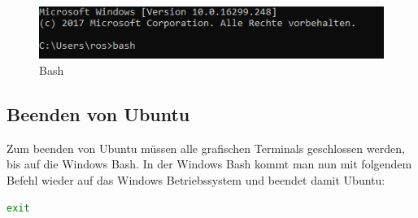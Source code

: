 \begin{figure}[H]
\centering
\includegraphics[scale=1.0]{Bilder/Bash.PNG}
\caption{Bash}
\label{fig:Bash}
\end{figure}

\subsection{Beenden von Ubuntu}
Zum beenden von Ubuntu müssen alle grafischen Terminals geschlossen werden, bis auf die Windows Bash. In der Windows Bash kommt man nun mit folgendem Befehl wieder auf das Windows Betriebssystem und beendet damit Ubuntu:
\begin{lstlisting}[language=bash]
exit
\end{lstlisting}
